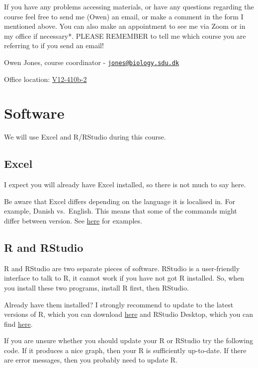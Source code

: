 \documentclass[
  a4paper]{book}
\begin{document}
If you have any problems accessing materials, or have any questions regarding the course feel free to send me (Owen) an email, or make a comment in the form I mentioned above. You can also make an appointment to see me via Zoom or in my office if necessary*. PLEASE REMEMBER to tell me which course you are referring to if you send an email!

Owen Jones, course coordinator - \href{mailto:jones@biology.sdu.dk}{\nolinkurl{jones@biology.sdu.dk}}

Office location: \href{https://clients.mapsindoors.com/sdu/573f26e4bc1f571b08094312/details/563cb94f423b7d0540c9a605}{V12-410b-2}

\section{Software}\label{software}

We will use Excel and R/RStudio during this course.

\subsection{Excel}\label{excel}

I expect you will already have Excel installed, so there is not much to say here.

Be aware that Excel differs depending on the language it is localised in. For example, Danish vs.~English. This means that some of the commands might differ between version.
See \href{https://easy-excel.com/excel-in-other-languages/excel-formulas-in-danish/}{here} for examples.

\subsection{R and RStudio}\label{r-and-rstudio}

R and RStudio are two separate pieces of software. RStudio is a user-friendly interface to talk to R, it cannot work if you have not got R installed. So, when you install these two programs, install R first, then RStudio.

Already have them installed? I strongly recommend to update to the latest versions of R, which you can download \href{https://cran.r-project.org}{here} and RStudio Desktop, which you can find \href{https://www.rstudio.com/products/rstudio/}{here}.

If you are unsure whether you should update your R or RStudio try the following code. If it produces a nice graph, then your R is sufficiently up-to-date. If there are error messages, then you probably need to update R.
\end{document}
